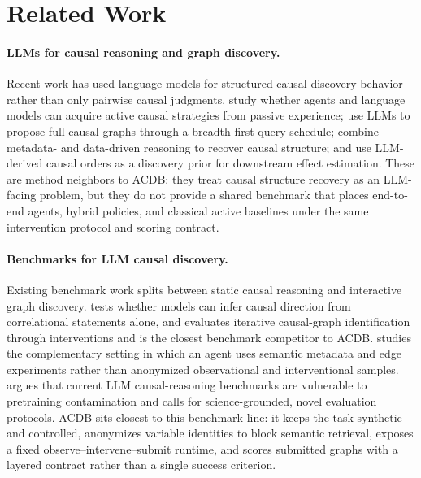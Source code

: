 \section{Related Work}
\label{sec:related}

\paragraph{LLMs for causal reasoning and graph discovery.} Recent work has used language models for structured causal-discovery behavior rather than only pairwise causal judgments. \citet{lampinen2023passive} study whether agents and language models can acquire active causal strategies from passive experience; \citet{jiralerspong2024bfs} use LLMs to propose full causal graphs through a breadth-first query schedule; \citet{abdulaal2024cma} combine metadata- and data-driven reasoning to recover causal structure; and \citet{vashishtha2023causalorder} use LLM-derived causal orders as a discovery prior for downstream effect estimation. These are method neighbors to ACDB: they treat causal structure recovery as an LLM-facing problem, but they do not provide a shared benchmark that places end-to-end agents, hybrid policies, and classical active baselines under the same intervention protocol and scoring contract.

\paragraph{Benchmarks for LLM causal discovery.} Existing benchmark work splits between static causal reasoning and interactive graph discovery. \citet{jin2024corr2cause} tests whether models can infer causal direction from correlational statements alone, and \citet{chen2025autobench} evaluates iterative causal-graph identification through interventions and is the closest benchmark competitor to ACDB. \citet{havrilla2025igda} studies the complementary setting in which an agent uses semantic metadata and edge experiments rather than anonymized observational and interventional samples. \citet{realizingllmcausal2025} argues that current LLM causal-reasoning benchmarks are vulnerable to pretraining contamination and calls for science-grounded, novel evaluation protocols. ACDB sits closest to this benchmark line: it keeps the task synthetic and controlled, anonymizes variable identities to block semantic retrieval, exposes a fixed observe--intervene--submit runtime, and scores submitted graphs with a layered contract rather than a single success criterion.
